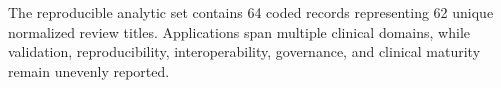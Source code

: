 The reproducible analytic set contains 64 coded records representing 62 unique normalized review titles. Applications span multiple clinical domains, while validation, reproducibility, interoperability, governance, and clinical maturity remain unevenly reported.
